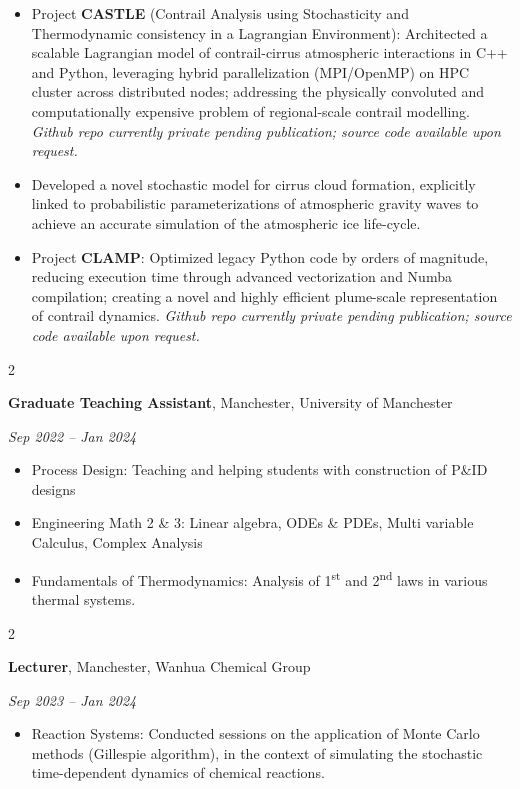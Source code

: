 \documentclass[10pt, letterpaper]{article}
\newenvironment{highlights}{
\begin{itemize}[
topsep=0.10 cm,
parsep=0.10 cm,
partopsep=0pt,
itemsep=0pt,
leftmargin=0.4 cm + 10pt
]
}{
\end{itemize}
} %
\newenvironment{twocolentry}[2][]{
\onecolentry
\def\secondColumn{#2}
\setcolumnwidth{\fill, 4.5 cm}
\begin{paracol}{2}
}{
\switchcolumn \raggedleft \secondColumn
\end{paracol}
\endonecolentry
} %
\begin{document}
\begin{highlights}
\item Project \textbf{CASTLE} (Contrail Analysis using Stochasticity and Thermodynamic consistency in a Lagrangian Environment): Architected a scalable Lagrangian model of contrail-cirrus atmospheric interactions in C++ and Python, leveraging hybrid parallelization (MPI/OpenMP) on HPC cluster across distributed nodes; addressing the physically convoluted and computationally expensive problem of regional-scale contrail modelling. \textit{Github repo currently private pending publication; source code available upon request.}
\item Developed a novel stochastic model for cirrus cloud formation, explicitly linked to probabilistic parameterizations of atmospheric gravity waves to achieve an accurate simulation of the atmospheric ice life-cycle. 
\item Project \textbf{CLAMP}: Optimized legacy Python code by orders of magnitude, reducing execution time through advanced vectorization and Numba compilation; creating a novel and highly efficient plume-scale representation of contrail dynamics. \textit{Github repo currently private pending publication; source code available upon request.}
\end{highlights}

\begin{twocolentry}{\textit{Sep 2022 – Jan 2024}}
\textbf{Graduate Teaching Assistant}, Manchester, University of Manchester
\end{twocolentry}

\begin{highlights}
\item Process Design: Teaching and helping students with construction of P\&ID designs
\item Engineering Math 2 \& 3: Linear algebra, ODEs \& PDEs, Multi variable Calculus, Complex Analysis
\item Fundamentals of Thermodynamics: Analysis of 1\textsuperscript{st} and 2\textsuperscript{nd} laws in various thermal systems.
\end{highlights}



\begin{twocolentry}{\textit{Sep 2023 – Jan 2024}}
\textbf{Lecturer}, Manchester, Wanhua Chemical Group
\end{twocolentry}

\begin{highlights}
\item Reaction Systems: Conducted sessions on the application of Monte Carlo methods (Gillespie algorithm), in the context of simulating the stochastic time-dependent dynamics of chemical reactions.
\end{highlights}
\end{document}
